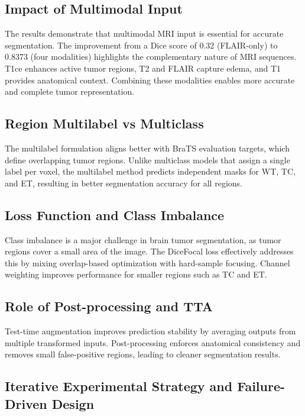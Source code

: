 \documentclass[conference]{IEEEtran}
\begin{document}
\subsection{Impact of Multimodal Input}

The results demonstrate that multimodal MRI input is essential for accurate segmentation. The improvement from a Dice score of 0.32 (FLAIR-only) to 0.8373 (four modalities) highlights the complementary nature of MRI sequences. T1ce enhances active tumor regions, T2 and FLAIR capture edema, and T1 provides anatomical context. Combining these modalities enables more accurate and complete tumor representation.

\subsection{Region Multilabel vs Multiclass}

The multilabel formulation aligns better with BraTS evaluation targets, which define overlapping tumor regions. Unlike multiclass models that assign a single label per voxel, the multilabel method predicts independent masks for WT, TC, and ET, resulting in better segmentation accuracy for all regions.

\subsection{Loss Function and Class Imbalance}

Class imbalance is a major challenge in brain tumor segmentation, as tumor regions cover a small area of the image. The DiceFocal loss effectively addresses this by mixing overlap-based optimization with hard-sample focusing. Channel weighting improves performance for smaller regions such as TC and ET.

\subsection{Role of Post-processing and TTA}

Test-time augmentation improves prediction stability by averaging outputs from multiple transformed inputs. Post-processing enforces anatomical consistency and removes small false-positive regions, leading to cleaner segmentation results.

\subsection{Iterative Experimental Strategy and Failure-Driven Design}
\end{document}
